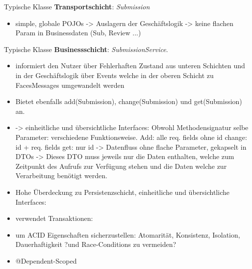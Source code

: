 \documentclass{beamer}
\begin{document}
    \begin{frame}{Typische Klasse \textbf{Transportschicht}:}
        \emph{Submission}
        \pause
        \begin{itemize}
            \item simple, globale POJOs
            -> Auslagern der Geschäftslogik
            -> keine flachen Param in Businessdaten (Sub, Review ...)
        \end{itemize}
    \end{frame}

    \begin{frame}{Typische Klasse \textbf{Businessschicht}:}
        \emph{SubmissionService}.
        \pause
        \begin{itemize}
            \item informiert den Nutzer über Fehlerhaften Zustand aus unteren Schichten und in der Geschäftslogik
            über Events welche in der oberen Schicht zu FacesMessages umgewandelt werden
            \item Bietet ebenfalls add(Submission), change(Submission)
            und get(Submission) an.
            \item -> einheitliche und übersichtliche Interfaces:
            Obwohl Methodensignatur selbe Parameter: verschiedene Funktionsweise.
            Add: alle req. fields ohne id
            change: id + req. fields
            get: nur id
            -> Datenfluss ohne flache Parameter, gekapselt in DTOs
            -> Dieses DTO muss jeweils nur die Daten enthalten, welche zum Zeitpunkt des Aufrufs
            zur Verfügung stehen und die Daten welche zur Verarbeitung benötigt werden.
            \item Hohe Überdeckung zu Persistenzschicht, einheitliche und übersichtliche Interfaces:
            \item verwendet Transaktionen:
            \item um ACID Eigenschaften sicherzustellen: Atomarität, Konsistenz, Isolation, Dauerhaftigkeit
            ?und Race-Conditions zu vermeiden?
            \item @Dependent-Scoped
        \end{itemize}
    \end{frame}
\end{document}
